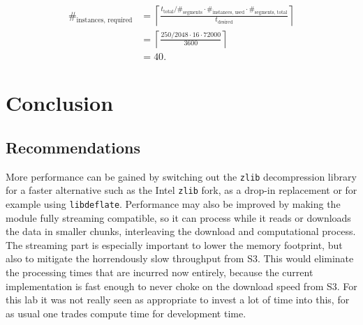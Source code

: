 \documentclass{article}
\begin{document}
\begin{align*}
	\#_{\text{instances, required}} &= \left\lceil\frac{t_{\text{total}} / \#_{\text{segments}} \cdot \#_{\text{instances, used}} \cdot \#_{\text{segments, total}}}{t_{\text{desired}}}\right\rceil \\
	&= \left\lceil\frac{250 / 2048 \cdot 16 \cdot 72000}{3600}\right\rceil \\
	&= 40.
\end{align*}

\section{Conclusion}

\subsection{Recommendations}
More performance can be gained by switching out the \texttt{zlib} decompression library for a faster alternative such as the Intel \texttt{zlib} fork, as a drop-in replacement or for example using \texttt{libdeflate}.
Performance may also be improved by making the module fully streaming compatible, so it can process while it reads or downloads the data in smaller chunks, interleaving the download and computational process.
The streaming part is especially important to lower the memory footprint, but also to mitigate the horrendously slow throughput from S3.
This would eliminate the processing times that are incurred now entirely, because the current implementation is fast enough to never choke on the download speed from S3.
For this lab it was not really seen as appropriate to invest a lot of time into this, for as usual one trades compute time for development time.


\printbibliography
\end{document}
